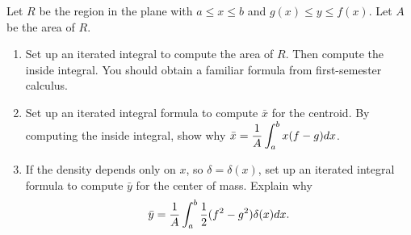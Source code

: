 \begin{problem}
Let $R$ be the region in the plane with $a\leq x\leq b$ and $g(x)\leq y\leq f(x)$.  Let $A$ be the area of $R$.
\begin{enumerate}
 \item Set up an iterated integral to compute the area of $R$.  Then compute the inside integral. You should obtain a familiar formula from first-semester calculus.
 \item 
Set up an iterated integral formula to compute $\bar x$ for the centroid. By computing the inside integral, show why $\displaystyle\bar x = \frac{1}{A}\int_a^b x (f-g)dx$.
 \item If the density depends only on $x$, so $\delta = \delta (x)$, set up an iterated integral formula to compute $\bar y$ for the center of mass. Explain why $$\displaystyle\bar y = \frac{1}{A}\int_a^b  \frac{1}{2}(f^2-g^2)\delta(x)dx.$$
\end{enumerate}
\end{problem}


